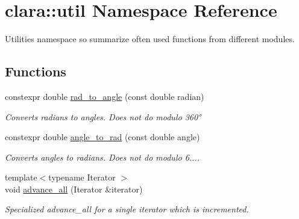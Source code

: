 \hypertarget{namespaceclara_1_1util}{}\section{clara\+:\+:util Namespace Reference}
\label{namespaceclara_1_1util}


Utilities namespace so summarize often used functions from different modules.  


\subsection*{Functions}
\begin{DoxyCompactItemize}
\item 
\mbox{\label{namespaceclara_1_1util_a203083303f1faa63dbff7ad716516b5b}} 
constexpr double \hyperlink{namespaceclara_1_1util_a203083303f1faa63dbff7ad716516b5b}{rad\+\_\+to\+\_\+angle} (const double radian)
\begin{DoxyCompactList}\small\item\em Converts radians to angles. Does not do {\ttfamily modulo 360°} \end{DoxyCompactList}\item 
\mbox{\label{namespaceclara_1_1util_ae062b8c2441737886151170147747c18}} 
constexpr double \hyperlink{namespaceclara_1_1util_ae062b8c2441737886151170147747c18}{angle\+\_\+to\+\_\+rad} (const double angle)
\begin{DoxyCompactList}\small\item\em Converts angles to radians. Does not do {\ttfamily modulo 6....} \end{DoxyCompactList}\item 
\mbox{\label{namespaceclara_1_1util_ad3e0d514883d6ffde9a1099e779bc094}} 
{\footnotesize template$<$typename Iterator $>$ }\\void \hyperlink{namespaceclara_1_1util_ad3e0d514883d6ffde9a1099e779bc094}{advance\+\_\+all} (Iterator \&iterator)
\begin{DoxyCompactList}\small\item\em Specialized advance\+\_\+all for a single iterator which is incremented. \end{DoxyCompactList}\item 
\mbox{\label{namespaceclara_1_1util_a2a91effd68bdcd381158dc56616849b3}} 

\end{DoxyCompactItemize}
